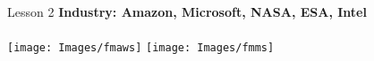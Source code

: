 \documentclass[aspectratio=1610]{beamer}
\begin{document}
\begin{frame}{Lesson 2}{}
\LARGE
\textbf{Industry: Amazon, Microsoft, NASA, ESA, Intel}\\~\\
\texttt{[image: Images/fmaws]}
\texttt{[image: Images/fmms]}
\end{frame}





\end{document}
